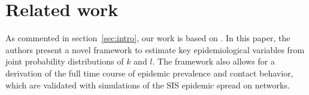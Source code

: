 \section{Related work}
As commented in section~\ref{sec:intro}, our work is based on \cite{10.1371/journal.pcbi.1003352}. In this paper, the authors present a novel framework to estimate key epidemiological variables from joint probability distributions of $k$ and $l$. The framework also allows for a derivation of the full time course of epidemic prevalence and contact behavior, which are validated with simulations of the SIS epidemic spread on networks.




